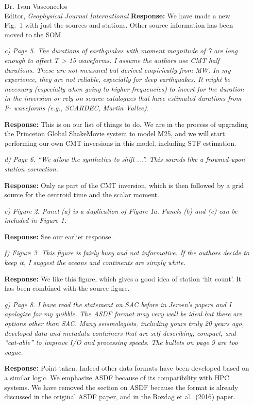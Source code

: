 \documentclass[11pt,a4paper]{letter}
\newcommand{\response}[1]{\textbf{Response:} #1}
\newcommand{\rev}[1]{{\it{#1}}}
\begin{document}
\begin{letter}{Dr.~Ivan Vasconcelos\\
Editor, \textit{Geophysical Journal International}}
\response{We have made a new Fig.~1 with just the sources and stations. Other source information has been moved to the SOM.}

\rev{c) Page 5. The durations of earthquakes with moment magnitude of 7 are long enough to affect T > 15 waveforms. I assume the authors use CMT half durations. These are not measured but derived empirically from MW. In my experience, they are not reliable, especially for deep earthquakes. It might be necessary (especially when going to higher frequencies) to invert for the duration in the inversion or rely on source catalogues that have estimated durations from P- waveforms (e.g., SCARDEC, Martin Vallee).
}

\response{This is on our list of things to do. We are in the process of upgrading the Princeton Global ShakeMovie system to model M25, and we will start performing our own CMT inversions in this model, including STF estimation.}

\rev{d) Page 6. ``We allow the synthetics to shift ...''. This sounds like a frowned-upon station correction.
}

\response{Only as part of the CMT inversion, which is then followed by a grid source for the centroid time and the scalar moment.}

\rev{e) Figure 2. Panel (a) is a duplication of Figure 1a. Panels (b) and (c) can be included in Figure 1.
}

\response{See our earlier response.}

\rev{f) Figure 3. This figure is fairly busy and not informative. If the authors decide to keep it, I suggest the oceans and continents are simply white.
}

\response{We like this figure, which gives a good idea of station `hit count'. It has been combined with the source figure.
}

\rev{g) Page 8. I have read the statement on SAC before in Jeroen's papers and I apologize for my quibble. The ASDF format may very well be ideal but there are options other than SAC. Many seismologists, including yours truly 20 years ago, developed data and metadata containers that are self-describing, compact, and ``cat-able'' to improve I/O and processing speeds. The bullets on page 9 are too vague.
}

\response{Point taken.  Indeed other data formats have been developed based on a similar logic. We emphasize ASDF because of its compatibility with HPC systems. We have removed the section on ASDF because the format is already discussed in the original ASDF paper, and in the Bozdag et al.~(2016) paper.}


\end{letter}
\end{document}
